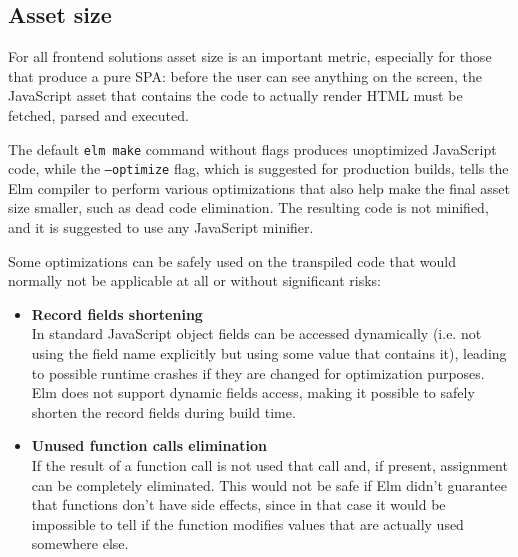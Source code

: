 \subsection{Asset size}
For all frontend solutions asset size is an important metric, especially for those that produce a pure SPA: before the user can see anything on the screen, the JavaScript asset that contains the code to actually render HTML must be fetched, parsed and executed.

The default \texttt{elm make} command without flags produces unoptimized JavaScript code, while the \texttt{--optimize} flag, which is suggested for production builds, tells the Elm compiler to perform various optimizations that also help make the final asset size smaller, such as dead code elimination. The resulting code is not minified, and it is suggested to use any JavaScript minifier. \cite{noauthor_minification_nodate}

Some optimizations can be safely used on the transpiled code that would normally not be applicable at all or without significant risks:
\begin{itemize}
    \item \textbf{Record fields shortening}\\In standard JavaScript object fields can be accessed dynamically (i.e. not using the field name explicitly but using some value that contains it), leading to possible runtime crashes if they are changed for optimization purposes. Elm does not support dynamic fields access, making it possible to safely shorten the record fields during build time.
    \item \textbf{Unused function calls elimination}\\If the result of a function call is not used that call and, if present, assignment can be completely eliminated. This would not be safe if Elm didn't guarantee that functions don't have side effects, since in that case it would be impossible to tell if the function modifies values that are actually used somewhere else.
\end{itemize}
